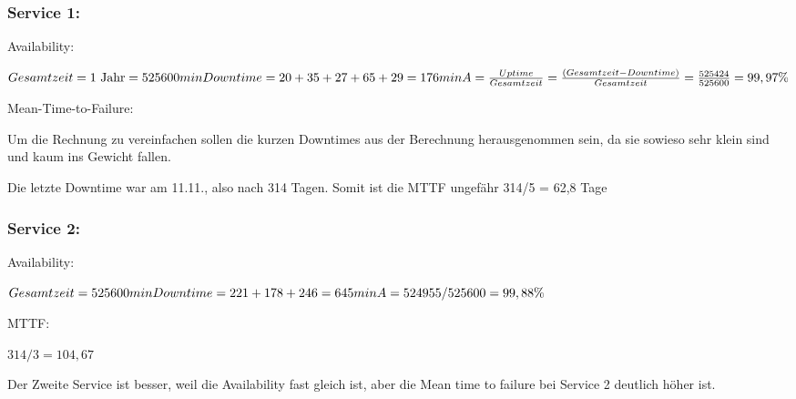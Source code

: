 \documentclass[a4paper,
			llpt,
			solution,
			accentcolor=tud2d,
			colorbacktitle
			]
			{tudexercise}
\begin{document}
\subsubsection*{Service 1:}

Availability:

\begin{math}
    Gesamtzeit = 1\ \textrm{Jahr} = 525 600 min \\
    Downtime = 20 + 35 + 27 + 65 + 29 = 176 min \\
    A = \frac{Uptime}{Gesamtzeit} = \frac{(Gesamtzeit - Downtime)}{Gesamtzeit} = \frac{525424}{525600} = 99,97 \%
\end{math}

Mean-Time-to-Failure:

Um die Rechnung zu vereinfachen sollen die kurzen Downtimes aus der Berechnung herausgenommen sein, da sie sowieso sehr klein sind und kaum ins Gewicht fallen.

Die letzte Downtime war am 11.11., also nach 314 Tagen. Somit ist die MTTF ungefähr 314/5 = 62,8 Tage

\subsubsection*{Service 2:}

Availability:

\begin{math}
    Gesamtzeit = 525 600 min \\
    Downtime = 221 + 178 + 246 = 645 min \\
    A = 524955/525600 = 99,88 \%
\end{math}

MTTF:

\begin{math}
314/3 = 104,67
\end{math}

Der Zweite Service ist besser, weil die Availability fast gleich ist, aber die Mean time to failure bei Service 2 deutlich höher ist.
\end{document}
